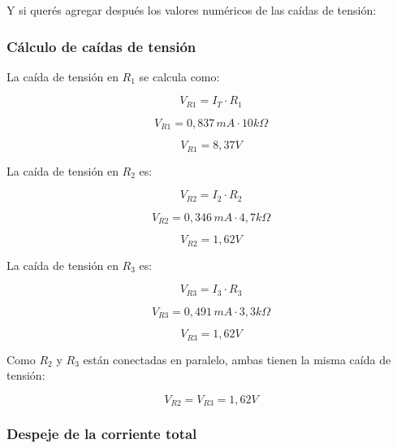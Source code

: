 \documentclass[a4paper,12pt]{article}
\begin{document}
	Y si querés agregar después los valores numéricos de las caídas de tensión:
	
	\subsubsection*{Cálculo de caídas de tensión}
	
	La caída de tensión en $R_1$ se calcula como:
	
	\[
	V_{R1} = I_T \cdot R_1
	\]
	
	\[
	V_{R1} = 0,837\,mA \cdot 10k\Omega
	\]
	
	\[
	V_{R1} = 8,37V
	\]
	
	La caída de tensión en $R_2$ es:
	
	\[
	V_{R2} = I_2 \cdot R_2
	\]
	
	\[
	V_{R2} = 0,346\,mA \cdot 4,7k\Omega
	\]
	
	\[
	V_{R2} = 1,62V
	\]
	
	La caída de tensión en $R_3$ es:
	
	\[
	V_{R3} = I_3 \cdot R_3
	\]
	
	\[
	V_{R3} = 0,491\,mA \cdot 3,3k\Omega
	\]
	
	\[
	V_{R3} = 1,62V
	\]
	
	Como $R_2$ y $R_3$ están conectadas en paralelo, ambas tienen la misma caída de tensión:
	
	\[
	V_{R2} = V_{R3} = 1,62V
	\]
	
	
	
	
	\subsubsection*{Despeje de la corriente total}
	
\end{document}
